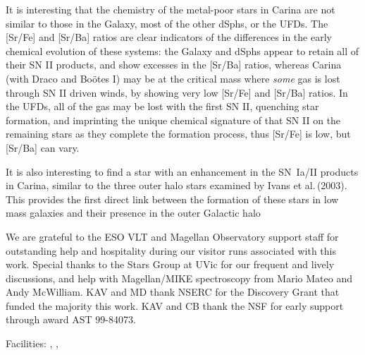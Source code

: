 \documentclass{emulateapj}
\newcommand\etal{{\rm et al.\,}}
\begin{document}
It is interesting that the chemistry of the metal-poor stars in Carina are
not similar to those in the Galaxy, most of the other dSphs, or the UFDs.   
The [Sr/Fe] and [Sr/Ba] ratios are clear indicators of the differences 
in the early chemical evolution of these systems:   the Galaxy and dSphs 
appear to retain all of their SN II products, and show excesses in the [Sr/Ba]
ratios, whereas Carina (with Draco and Bo\"otes I) may be at the critical mass 
where {\it some} gas is lost through SN II driven winds, by showing
very low [Sr/Fe] and [Sr/Ba] ratios.  In the UFDs, all of the gas may be lost 
with the first SN II, quenching star formation, and imprinting 
the unique chemical signature of that SN II on the remaining stars as they 
complete the formation process, thus [Sr/Fe] is low, but [Sr/Ba] can vary.    

It is also interesting to find a star with an enhancement in the SN~Ia/II
products in Carina, similar to the three outer halo stars examined by
Ivans \etal (2003).   This provides the first direct link between the formation 
of these stars in low mass galaxies and their presence in the outer Galactic halo 


\acknowledgements
We are grateful to the ESO VLT and Magellan Observatory support staff for outstanding
help and hospitality during our visitor runs associated with this work.    
Special thanks to the Stars Group at UVic for our frequent and lively discussions, and
help with Magellan/MIKE spectroscopy from Mario Mateo and Andy McWilliam.
KAV and MD thank NSERC for the Discovery Grant that funded the majority this work.  
KAV and CB thank the NSF for early support through award AST 99-84073.  

{Facilities:} , ,

%
\end{document}
